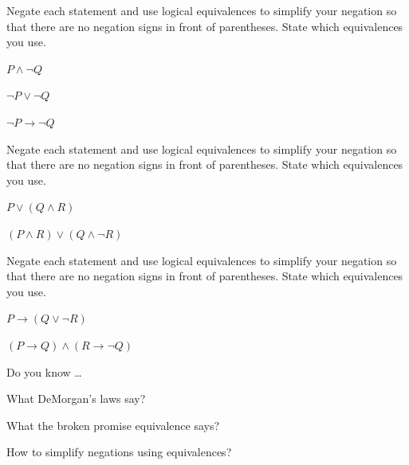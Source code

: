 \begin{exer}[\exerP] %
\label{exer_neg_simple_2vars}
    Negate each statement and use logical equivalences to simplify your negation so that there are no negation signs in front of parentheses. State which equivalences you use.
        \begin{exerpart}                 
            \item $P \land \neg Q$
            \item $\neg P \lor \neg Q$
            \item $\neg P \to \neg Q$
        \end{exerpart}
\end{exer}

\begin{exer}[\exerU] %
\label{exer_neg_complicated_and_or}
    Negate each statement and use logical equivalences to simplify your negation so that there are no negation signs in front of parentheses. State which equivalences you use.
        \begin{exerpart}           
            \item $P \lor (Q \land R)$
            \item $(P \land R) \lor (Q \land \neg R)$
        \end{exerpart}
\end{exer}

\begin{exer}[\exerU] %
\label{exer_neg_ifthen}
    Negate each statement and use logical equivalences to simplify your negation so that there are no negation signs in front of parentheses. State which equivalences you use.
        \begin{exerpart}           
            \item $P \to (Q \lor \neg R)$
            \item $(P \to Q) \land (R \to \neg Q)$ 
        \end{exerpart}
\end{exer}

\begin{exer}[\exerR] %
\label{exer_dyk_simplify_neg}
    Do you know \ldots
        \begin{exerpart}
            \item What DeMorgan's laws say?
            \item What the broken promise equivalence says?
            \item How to simplify negations using equivalences? 
        \end{exerpart}
\end{exer}

